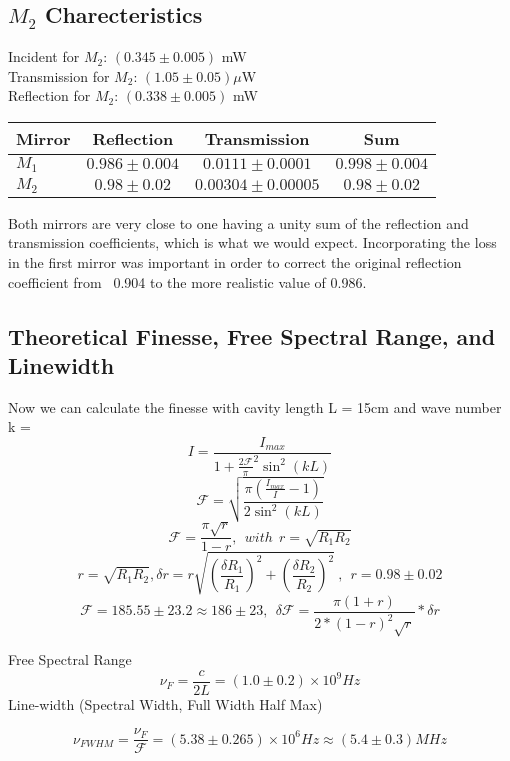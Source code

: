 \documentclass[11pt]{article}
\begin{document}
\subsection{$M_2$ Charecteristics}
Incident for $M_2$:
$(0.345 \pm 0.005)$ mW \\
Transmission for $M_2$:
$(1.05 \pm 0.05) \mu$W \\
Reflection for $M_2$:
$(0.338 \pm 0.005)$  mW \\



\begin{center}
	\begin{tabular}{l|ccc}
  Mirror & Reflection & Transmission & Sum \\
  \hline
  $M_1$ & $0.986 \pm 0.004$ & $0.0111 \pm 0.0001$ & $0.998 \pm 0.004$ \\
  $M_2$ & $0.98 \pm 0.02 $ & $0.00304 \pm 0.00005 $ & $0.98 \pm 0.02$ 
\end{tabular}
\end{center}

Both mirrors are very close to one having a unity sum of the reflection and transmission coefficients, which is what we would expect. Incorporating the loss in the first mirror was important in order to correct the original reflection coefficient from ~0.904 to the more realistic value of 0.986. \\

\subsection{Theoretical Finesse, Free Spectral Range, and Linewidth}

Now we can calculate the finesse with cavity length L = 15cm and wave number k = 
 $$I = \frac{I_{max}}{1 + \frac{2\mathscr{F}}{\pi}^2\sin^2(kL)} $$
 $$\mathscr{F} = \sqrt{ \frac{\pi(\frac{I_{max}}{I} - 1)}{2\sin^2(kL)}}$$
 $$\mathscr{F} = \frac{\pi\sqrt{r}}{1-r},\ \ with \ \ r = \sqrt{R_1R_2}$$
$$ r = \sqrt{R_1R_2}, \delta r = r \sqrt{(\frac{\delta R_1}{R_1})^2 + (\frac{\delta R_2}{R_2})^2}\ ,\ \  r = 0.98 \pm 0.02 $$ 
$$\mathscr{F} = 185.55 \pm 23.2 \approx 186 \pm 23 , \ \  \delta \mathscr{F} = \frac{\pi (1+r)}{2*(1-r)^2\sqrt{r}} * \delta r$$

Free Spectral Range
$$ \nu_F = \frac{c}{2L} = (1.0 \pm 0.2)\times 10^9 Hz $$
Line-width (Spectral Width, Full Width Half Max)

$$\nu_{FWHM} = \frac{\nu_F}{\mathscr{F}} = (5.38 \pm 0.265 )\times 10^6 Hz \approx (5.4\pm0.3)MHz $$
\end{document}
